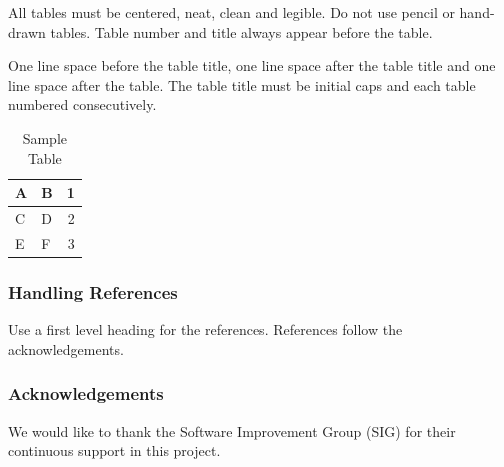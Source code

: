 \documentclass[a4paper]{article}
\begin{document}
All tables must be centered, neat, clean and legible. Do not use pencil
or hand-drawn tables. Table number and title always appear before the
table.

One line space before the table title, one line space after the table
title and one line space after the table. The table title must be
initial caps and each table numbered consecutively.

\begin{table}[ht]
\begin{center}
\caption{Sample Table}

\bigskip

\begin{tabular}{|l|l|r|}
\hline
A & B & 1\\ \hline
C & D & 2\\
E & F & 3\\ \hline
\end{tabular}
\end{center}
\end{table}


\subsubsection{Handling References}

Use a first level heading for the references. References follow the
acknowledgements.


\subsubsection{Acknowledgements}
We would like to thank the Software Improvement Group (SIG) for their continuous support in this project.






\end{document}
